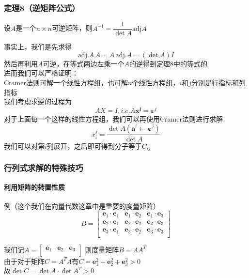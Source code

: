 \documentclass{article}
\newcommand{\ve}{\boldsymbol}
\begin{document}
\begin{CJK}{UTF8}{gkai}
\subsubsection{定理8（逆矩阵公式）}
设$A$是一个$n\times n$可逆矩阵，则$A^{-1}=\dfrac{1}{\det A}\text{adj} A$

事实上，我们是先求得\[\text{adj.}A \,A=A \,\text{adj.}A=(\det A) I\]
然后再利用$A$可逆，在等式两边左乘一个$A$的逆得到定理8中的等式的\\

进而我们可以严格证明：\\
Cramer法则可解一个线性方程组，也可解$n$个线性方程组，$i$和$j$分别是行指标和列指标\\
我们考虑求逆的过程为\[AX=I,i.e. A\ve{x^j}=\ve{\varepsilon}^j\]
对于上面每一个这样的线性方程组，我们可以再使用Cramer法则进行求解\\
\[x_i^j=\dfrac{\det A(\ve{a}^i\leftarrow\ve{\varepsilon}^j)}{\det A}\]
我们可以对第$i$列展开，之后即可得到分子等于$C_{ij}$\\
\subsubsection{行列式求解的特殊技巧}
\paragraph{利用矩阵的转置性质\\}
例（这个我们在向量代数这章中是重要的度量矩阵）\\
\[B=
\begin{bmatrix}
    \ve{e}_1\cdot\ve{e}_1&\ve{e}_1\cdot\ve{e}_2&\ve{e}_1\cdot\ve{e}_3\\
    \ve{e}_2\cdot\ve{e}_1&\ve{e}_2\cdot\ve{e}_2&\ve{e}_2\cdot\ve{e}_3\\
    \ve{e}_3\cdot\ve{e}_1&\ve{e}_3\cdot\ve{e}_2&\ve{e}_3\cdot\ve{e}_3\\    
\end{bmatrix}
\]

我们记$A=\begin{bmatrix}
    \ve{e}_1&\ve{e}_2&\ve{e}_3\\
\end{bmatrix}$
则度量矩阵$B=AA^T$\\

由于对于矩阵$C=A^T A$有$C=\ve{e}_1^2+\ve{e}_2^2+\ve{e}_3^2>0$\\

故$\det C=\det A \cdot \det A^T>0$\\


\end{CJK}
\end{document}
